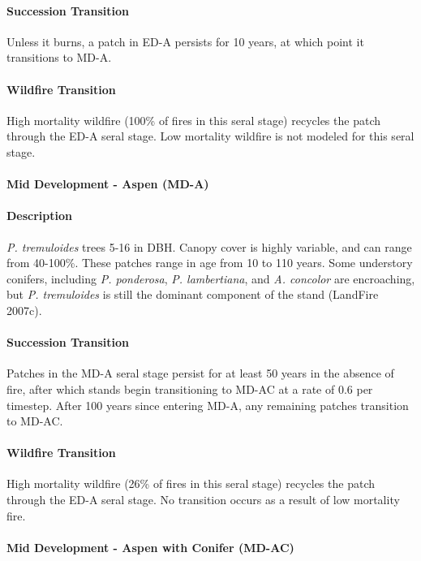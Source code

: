 \paragraph{Succession Transition} Unless it burns, a patch in ED-A persists for 10 years, at which point it transitions to MD-A.

\paragraph{Wildfire Transition} High mortality wildfire (100\% of fires in this seral stage) recycles the patch through the ED-A seral stage. Low mortality wildfire is not modeled for this seral stage.

\noindent\hrulefill


\paragraph{Mid Development - Aspen (MD-A)}

\paragraph{Description} \emph{P. tremuloides} trees 5-16 in DBH. Canopy cover is highly variable, and can range from 40-100\%. These patches range in age from 10 to 110 years. Some understory conifers, including \emph{P. ponderosa}, \emph{P. lambertiana}, and \emph{A. concolor} are encroaching, but \emph{P. tremuloides} is still the dominant component of the stand (LandFire 2007c).

\paragraph{Succession Transition} Patches in the MD-A seral stage persist for at least 50 years in the absence of fire, after which stands begin transitioning to MD-AC at a rate of 0.6 per timestep. After 100 years since entering MD-A, any remaining patches transition to MD-AC. 

\paragraph{Wildfire Transition} High mortality wildfire (26\% of fires in this seral stage) recycles the patch through the ED-A seral stage. No transition occurs as a result of low mortality fire.

\noindent\hrulefill

\paragraph{Mid Development - Aspen with Conifer (MD-AC)}

